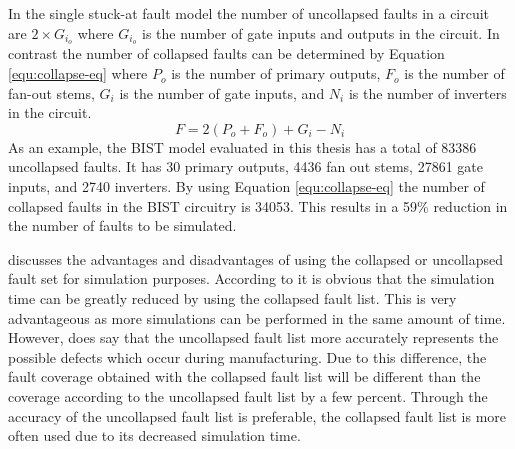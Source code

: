 \documentclass[12pt]{report}
\begin{document}
In the single stuck-at fault model the number of uncollapsed faults in a circuit are $2 \times G_i_o$ where $G_i_o$ is the number of gate inputs and outputs in the circuit\cite{stroud}.  In contrast the number of collapsed faults can be determined by Equation \ref{equ:collapse-eq} where $P_o$ is the number of primary outputs, $F_o$ is the number of fan-out stems, $G_i$ is the number of gate inputs, and $N_i$ is the number of inverters in the circuit\cite{stroud}.
\begin{equation}
F = 2(P_o + F_o) + G_i - N_i
\label{equ:collapse-eq}
\end{equation}
As an example, the BIST model evaluated in this thesis has a total of 83386 uncollapsed faults.  It has 30 primary outputs, 4436 fan out stems, 27861 gate inputs, and 2740 inverters.  By using Equation \ref{equ:collapse-eq} the number of collapsed faults in the BIST circuitry is 34053.  This results in a 59\% reduction in the number of faults to be simulated.  

\cite{stroud} discusses the advantages and disadvantages of using the collapsed or uncollapsed fault set for simulation purposes.  According to \cite{stroud} it is obvious that the simulation time can be greatly reduced by using the collapsed fault list.  This is very advantageous as more simulations can be performed in the same amount of time.  However, \cite{stroud} does say that the uncollapsed fault list more accurately represents the possible defects which occur during manufacturing.  Due to this difference, the fault coverage obtained with the collapsed fault list will be different than the coverage according to the uncollapsed fault list by a few percent\cite{stroud}.  Through the accuracy of the uncollapsed fault list is preferable, the collapsed fault list is more often used due to its decreased simulation time\cite{stroud}.
\end{document}

